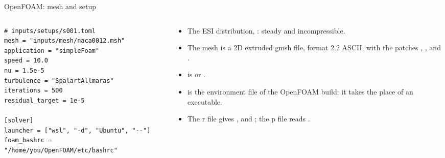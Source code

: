 \begin{frame}[fragile]{OpenFOAM: mesh and setup}
\begin{columns}[T]
\begin{column}{0.5\textwidth}
\begin{lstlisting}[style=cfdbtoml]
# inputs/setups/s001.toml
mesh = "inputs/mesh/naca0012.msh"
application = "simpleFoam"
speed = 10.0
nu = 1.5e-5
turbulence = "SpalartAllmaras"
iterations = 500
residual_target = 1e-5

[solver]
launcher = ["wsl", "-d", "Ubuntu", "--"]
foam_bashrc = "/home/you/OpenFOAM/etc/bashrc"
\end{lstlisting}
\end{column}
\begin{column}{0.46\textwidth}
\begin{itemize}\small
  \item The ESI distribution, : steady and incompressible.
  \item The mesh is a 2D extruded gmsh file, format 2.2 ASCII, with the
        patches , ,  and
        .
  \item {} is  or .
  \item {} is the environment file of the OpenFOAM build:
        it takes the place of an executable.
  \item The r file gives ,  and
        ; the p file reads .
\end{itemize}
\end{column}
\end{columns}
\end{frame}

